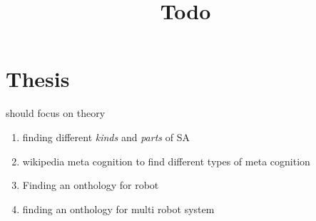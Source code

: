 \documentclass[a4paper]{article}
\title{Todo}
\date{}
\begin{document}
    \maketitle
    
    \section{Thesis}
    should focus on theory
    
    \begin{enumerate}
        \item finding different \textit{kinds} and \textit{parts} of SA
        \item wikipedia meta cognition to find different types of meta cognition
        \item Finding an onthology for robot
        \item finding an onthology for multi robot system
    \end{enumerate}

\end{document}
